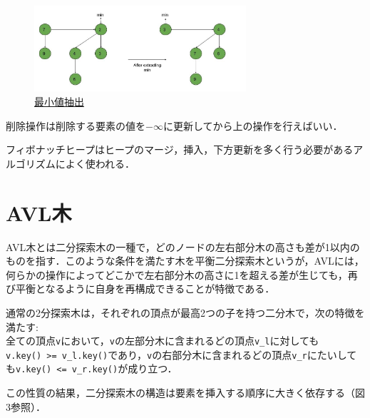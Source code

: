\documentclass[
]{ltjarticle}
\begin{document}
\begin{figure}
\centering
\includegraphics[width=0.7\textwidth]{fib-heap-extr-min-1.jpg}
\caption{\href{https://www.geeksforgeeks.org/fibonacci-heap-deletion-extract-min-and-decrease-key/}{最小値抽出}}
\end{figure}

削除操作は削除する要素の値を\(-\infty\)に更新してから上の操作を行えばいい．

フィボナッチヒープはヒープのマージ，挿入，下方更新を多く行う必要があるアルゴリズムによく使われる．

\newpage

\hypertarget{avlux6728}{%
\section{AVL木}\label{avlux6728}}

AVL木とは二分探索木の一種で，どのノードの左右部分木の高さも差が1以内のものを指す．このような条件を満たす木を平衡二分探索木というが，AVLには，何らかの操作によってどこかで左右部分木の高さに1を超える差が生じても，再び平衡となるように自身を再構成できることが特徴である．

通常の2分探索木は，それぞれの頂点が最高2つの子を持つ二分木で，次の特徴を満たす:\\
全ての頂点\texttt{v}において，\texttt{v}の左部分木に含まれるどの頂点\texttt{v\_l}に対しても\texttt{v.key()\ \textgreater{}=\ v\_l.key()}であり，\texttt{v}の右部分木に含まれるどの頂点\texttt{v\_r}にたいしても\texttt{v.key()\ \textless{}=\ v\_r.key()}が成り立つ．

この性質の結果，二分探索木の構造は要素を挿入する順序に大きく依存する（図3参照）．
\end{document}
